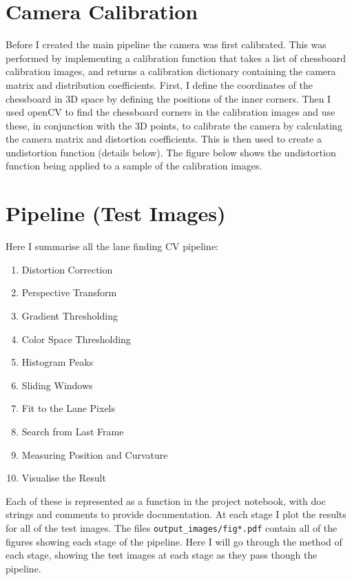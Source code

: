 \documentclass[letterpaper,12pt]{article}
\begin{document}
\section{Camera Calibration}
Before I created the main pipeline the camera was first calibrated. This was performed by implementing a calibration function that takes a list of chessboard calibration images, and returns a calibration dictionary containing the camera matrix and distribution coefficients. First, I define the coordinates of the chessboard in 3D space by defining the positions of the inner corners. Then I used openCV to find the chessboard corners in the calibration images and use these, in conjunction with the 3D points, to calibrate the camera by calculating the camera matrix and distortion coefficients. This is then used to create a undistortion function (details below). The figure below shows the undistortion function being applied to a sample of the calibration images.
\FloatBarrier
\begin{figure}
\centering
{}
\end{figure}
\FloatBarrier


\section{Pipeline (Test Images)}
Here I summarise all the lane finding CV pipeline:
\begin{enumerate}
\item Distortion Correction
\item Perspective Transform
\item Gradient Thresholding
\item Color Space Thresholding
\item Histogram Peaks
\item Sliding Windows
\item Fit to the Lane Pixels
\item Search from Last Frame
\item Measuring Position and Curvature
\item Visualise the Result
\end{enumerate}
Each of these is represented as a function in the project notebook, with doc strings and comments to provide documentation. At each stage I plot the results for all of the test images. The files \texttt{output\_images/fig*.pdf} contain all of the figures showing each stage of the pipeline. Here I will go through the method of each stage, showing the test images at each stage as they pass though the pipeline.
\newpage
\end{document}
